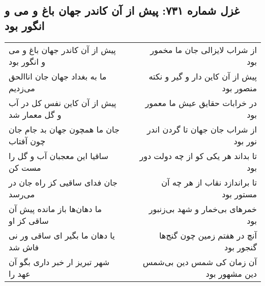 \begin{center}
\section*{غزل شماره ۷۳۱: پیش از آن کاندر جهان باغ و می و انگور بود}
\label{sec:0731}
\begin{longtable}{l p{0.5cm} r}
پیش از آن کاندر جهان باغ و می و انگور بود
&&
از شراب لایزالی جان ما مخمور بود
\\
ما به بغداد جهان جان اناالحق می‌زدیم
&&
پیش از آن کاین دار و گیر و نکته منصور بود
\\
پیش از آن کاین نفس کل در آب و گل معمار شد
&&
در خرابات حقایق عیش ما معمور بود
\\
جان ما همچون جهان بد جام جان چون آفتاب
&&
از شراب جان جهان تا گردن اندر نور بود
\\
ساقیا این معجبان آب و گل را مست کن
&&
تا بداند هر یکی کو از چه دولت دور بود
\\
جان فدای ساقیی کز راه جان در می‌رسد
&&
تا براندازد نقاب از هر چه آن مستور بود
\\
ما دهان‌ها باز مانده پیش آن ساقی کز او
&&
خمرهای بی‌خمار و شهد بی‌زنبور بود
\\
یا دهان ما بگیر ای ساقی ور نی فاش شد
&&
آنچ در هفتم زمین چون گنج‌ها گنجور بود
\\
شهر تبریز ار خبر داری بگو آن عهد را
&&
آن زمان کی شمس دین بی‌شمس دین مشهور بود
\\
\end{longtable}
\end{center}
